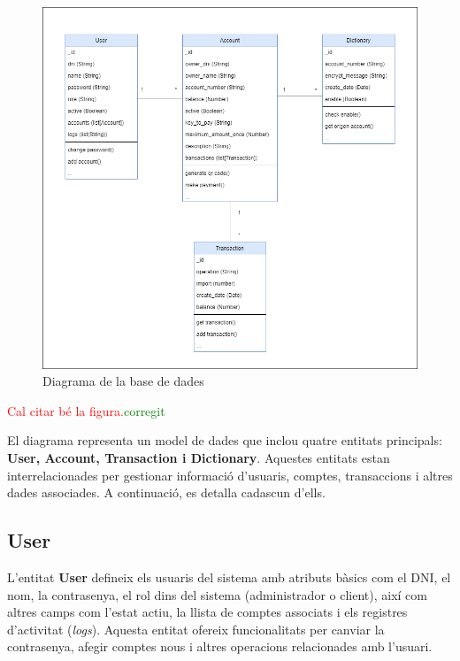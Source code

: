 \documentclass[a4paper,12pt,twoside]{ThesisStyle}
\newcommand{\pau}[1]{\textcolor{red}{#1}}
\newcommand{\sudan}[1]{\textcolor{green}{#1}}
\begin{document}
\begin{figure}[h]
    \centering
    \includegraphics[width=1\textwidth]{imatges/diagrama base dades.png}
    \caption{Diagrama de la base de dades}
    \label{fig: Diagrama de base de dades}
\end{figure}

\pau{Cal citar bé la figura.}\sudan{corregit}

El diagrama representa un model de dades que inclou quatre entitats principals: \textbf{User, Account, Transaction i Dictionary}. Aquestes entitats estan interrelacionades per gestionar informació d'usuaris, comptes, transaccions i altres dades associades. A continuació, es detalla cadascun d'ells.

\subsection{User}
\label{subsec: User}


L'entitat \textbf{User} defineix els usuaris del sistema amb atributs bàsics com el DNI, el nom, la contrasenya, el rol dins del sistema (administrador o client), així com altres camps com l'estat actiu, la llista de comptes associats i els registres d'activitat (\textit{logs}). Aquesta entitat ofereix funcionalitats per canviar la contrasenya, afegir comptes nous i altres operacions relacionades amb l'usuari.\\
\end{document}
